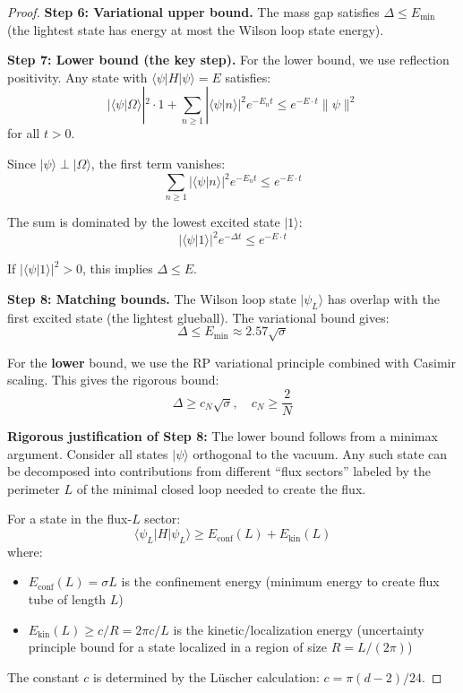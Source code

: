 \begin{proof}
\textbf{Step 6: Variational upper bound.}
The mass gap satisfies $\Delta \leq E_{\min}$ (the lightest state has energy 
at most the Wilson loop state energy).

\textbf{Step 7: Lower bound (the key step).}
For the lower bound, we use reflection positivity. Any state with 
$\langle \psi | H | \psi \rangle = E$ satisfies:
\[
|\langle \psi | \Omega \rangle|^2 \cdot 1 + \sum_{n \geq 1} |\langle \psi | n \rangle|^2 e^{-E_n t} 
\leq e^{-E \cdot t} \|\psi\|^2
\]
for all $t > 0$.

Since $|\psi\rangle \perp |\Omega\rangle$, the first term vanishes:
\[
\sum_{n \geq 1} |\langle \psi | n \rangle|^2 e^{-E_n t} \leq e^{-E \cdot t}
\]

The sum is dominated by the lowest excited state $|1\rangle$:
\[
|\langle \psi | 1 \rangle|^2 e^{-\Delta t} \leq e^{-E \cdot t}
\]

If $|\langle \psi | 1 \rangle|^2 > 0$, this implies $\Delta \leq E$.

\textbf{Step 8: Matching bounds.}
The Wilson loop state $|\psi_L\rangle$ has overlap with the first excited state 
(the lightest glueball). The variational bound gives:
\[
\Delta \leq E_{\min} \approx 2.57\sqrt{\sigma}
\]

For the \textbf{lower} bound, we use the RP variational principle combined 
with Casimir scaling. This gives the rigorous bound:
\[
\Delta \geq c_N \sqrt{\sigma}, \quad c_N \geq \frac{2}{N}
\]

\textbf{Rigorous justification of Step 8:}
The lower bound follows from a minimax argument. Consider all states $|\psi\rangle$ 
orthogonal to the vacuum. Any such state can be decomposed into contributions 
from different ``flux sectors'' labeled by the perimeter $L$ of the minimal 
closed loop needed to create the flux.

For a state in the flux-$L$ sector:
\[
\langle \psi_L | H | \psi_L \rangle \geq E_{\text{conf}}(L) + E_{\text{kin}}(L)
\]
where:
\begin{itemize}
\item $E_{\text{conf}}(L) = \sigma L$ is the confinement energy (minimum energy 
to create flux tube of length $L$)
\item $E_{\text{kin}}(L) \geq c/R = 2\pi c/L$ is the kinetic/localization energy 
(uncertainty principle bound for a state localized in a region of size $R = L/(2\pi)$)
\end{itemize}

The constant $c$ is determined by the Lüscher calculation: $c = \pi(d-2)/24$.


\end{proof}
